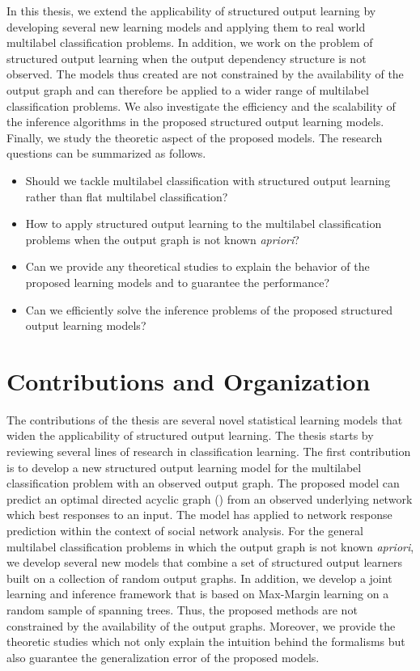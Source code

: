 In this thesis, we extend the applicability of structured output learning by developing several new learning models and applying them to real world multilabel classification problems.
In addition, we work on the problem of structured output learning when the output dependency structure is not observed.
The models thus created are not constrained by the availability of the output graph and can therefore be applied to a wider range of multilabel classification problems.
We also investigate the efficiency and the scalability of the inference algorithms in the proposed structured output learning models.
Finally, we study the theoretic aspect of the proposed models.
The research questions can be summarized as follows.
\begin{itemize}
\item Should we tackle multilabel classification with structured output learning rather than flat multilabel classification?
\item How to apply structured output learning to the multilabel classification problems when the output graph is not known \textit{apriori}?
\item Can we provide any theoretical studies to explain the behavior of the proposed learning models and to guarantee the performance?
\item Can we efficiently solve the inference problems of the proposed structured output learning models?
\end{itemize}



%
%
\section{Contributions and Organization}

The contributions of the thesis are several novel statistical learning models that widen the applicability of structured output learning.
The thesis starts by reviewing several lines of research in classification learning.
The first contribution is to develop a new structured output learning model for the multilabel classification problem with an observed output graph.
The proposed model can predict an optimal directed acyclic graph (\daggraph) from an observed underlying network which best responses to an input.
The model has applied to network response prediction within the context of social network analysis.
For the general multilabel classification problems in which the output graph is not known \textit{apriori}, we develop several new models that combine a set of structured output learners built on a collection of random output graphs.
In addition, we develop a joint learning and inference framework that is based on Max-Margin learning on a random sample of spanning trees.
Thus, the proposed methods are not constrained by the availability of the output graphs.
Moreover, we provide the theoretic studies which not only explain the intuition behind the formalisms but also guarantee the generalization error of the proposed models.

